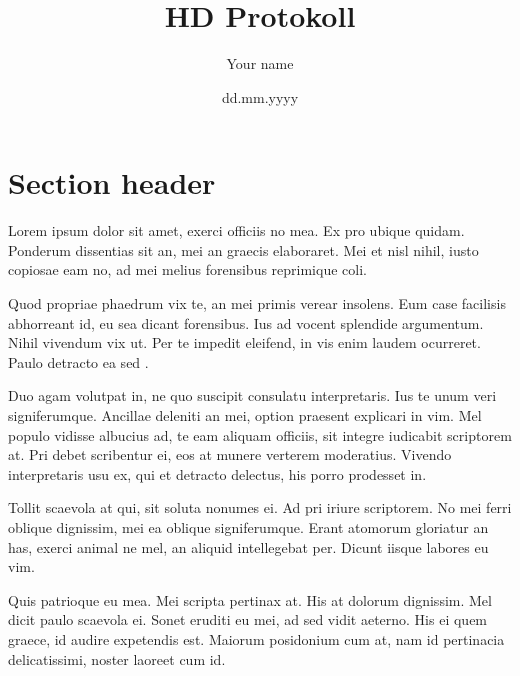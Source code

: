 \documentclass[%
 12pt,           %
 english,        %
 a4paper,        %
 DIV14,          %
 twoside,        %
 thesis,         %
 impberklaerung, %
]{hdprotokoll}
\title{HD Protokoll}
\author{Your name}
\date{dd.mm.yyyy}
\institute{free text}
\begin{document}
\maketitle                       %
\cleardoublepage                 %

\tableofcontents                 %

\newpage        			     %
\printglossaries                 %

\cleardoublepage                 %


\section{Section header}
Lorem ipsum dolor sit amet, exerci officiis no mea. Ex pro ubique quidam. Ponderum dissentias sit an, mei an graecis elaboraret. Mei et nisl nihil, iusto copiosae eam no, ad mei melius forensibus reprimique \gls{coli}.

Quod propriae phaedrum vix te, an mei primis verear insolens. Eum case facilisis abhorreant id, eu sea dicant forensibus. Ius ad vocent splendide argumentum. Nihil vivendum vix ut. Per te impedit eleifend, in vis enim laudem ocurreret. Paulo detracto ea sed \citep{hector1999plant}.

Duo agam volutpat in, ne quo suscipit consulatu interpretaris. Ius te unum veri signiferumque. Ancillae deleniti an mei, option praesent explicari in vim. Mel populo vidisse albucius ad, te eam aliquam officiis, sit integre iudicabit scriptorem at. Pri debet scribentur ei, eos at munere verterem moderatius. Vivendo interpretaris usu ex, qui et detracto delectus, his porro prodesset in.

Tollit scaevola at qui, sit soluta nonumes ei. Ad pri iriure scriptorem. No mei ferri oblique dignissim, mei ea oblique signiferumque. Erant atomorum gloriatur an has, exerci animal ne mel, an aliquid intellegebat per. Dicunt iisque labores eu vim.

Quis patrioque eu mea. Mei scripta pertinax at. His at dolorum dignissim. Mel dicit paulo scaevola ei. Sonet eruditi eu mei, ad sed vidit aeterno. His ei quem graece, id audire expetendis est. Maiorum posidonium cum at, nam id pertinacia delicatissimi, noster laoreet cum id.

\printbibliography                %
\end{document}
